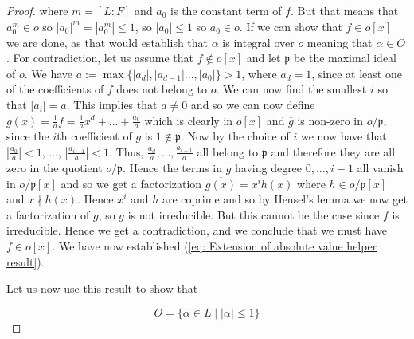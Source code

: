 \documentclass{article}
\newcommand{\mfrak}[1]{\mathfrak{#1}}
\begin{document}
\begin{proof}
    where $m = [L : F]$ and $a_0$ is the constant term of $f$. But that means that $a_0^m \in o$ so $|a_0|^m = |a_0^m| \leq 1$, so $|a_0| \leq 1$ so $a_0 \in o$. If we can show that $f \in o[x]$ we are done, as that would establish that $\alpha$ is integral over $o$ meaning that $\alpha \in O$. For contradiction, let us assume that $f \notin o[x]$ and let $\mfrak p$ be the maximal ideal of $o$. We have $a := \max\{|a_d|, |a_{d-1}| ..., |a_0| \} > 1$, where $a_d = 1$, since at least one of the coefficients of $f$ does not belong to $o$. We can now find the smallest $i$ so that $|a_i| = a$. This implies that $a \neq 0$ and so we can now define $g(x) = \frac{1}{a}f = \frac{1}{a}x^d + ... + \frac{a_0}{a}$ which is clearly in $o[x]$ and $\overline g$ is non-zero in $o/\mfrak p$, since the $i$th coefficient of $g$ is $1 \notin \mfrak p$. Now by the choice of $i$ we now have that $|\frac{a_0}{a}| < 1$, ..., $|\frac{a_{i-1}}{a}| < 1$. Thus, $\frac{a_d}{a}, ..., \frac{a_{i+1}}{a}$ all belong to $\mfrak p$ and therefore they are all zero in the quotient $o/\mfrak p$. Hence the terms in $g$ having degree $0, ..., i-1$ all vanish in $o/\mfrak p[x]$ and so we get a factorization $\overline {g(x)} = x^i h(x)$ where $h \in o/\mfrak p[x]$ and $x \nmid h(x)$. Hence $x^i$ and $h$ are coprime and so by Hensel's lemma we now get a factorization of $g$, so $g$ is not irreducible. But this cannot be the case since $f$ is irreducible. Hence we get a contradiction, and we conclude that we must have $f \in o[x]$. We have now established (\ref{eq: Extension of absolute value helper result}).


    
    
    Let us now use this result to show that 
    
    $$O = \{\alpha \in L \mid |\alpha| \leq 1  \}$$
    

\end{proof}
\end{document}
